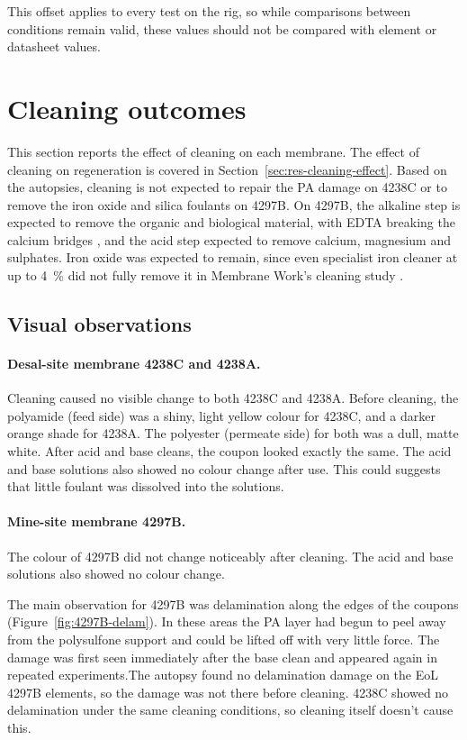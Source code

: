 This offset applies to every test on the rig, so while comparisons between conditions remain valid, these values should not be compared with element or datasheet values.

\section{Cleaning outcomes}
\label{sec:res-cleaning}
This section reports the effect of cleaning on each membrane. The effect of cleaning on regeneration is covered in Section~\ref{sec:res-cleaning-effect}. Based on the autopsies, cleaning is not expected to repair the PA damage on 4238C or to remove the iron oxide and silica foulants on 4297B. On 4297B, the alkaline step is expected to remove the organic and biological material, with EDTA breaking the calcium bridges \citep{Ang2006}, and the acid step expected to remove calcium, magnesium and sulphates. Iron oxide was expected to remain, since even specialist iron cleaner at up to \qty{4}{\percent} did not fully remove it in Membrane Work's cleaning study \citep{MembraneWorks2026Mine}.


\subsection{Visual observations}
\paragraph{Desal-site membrane 4238C and 4238A. } 
Cleaning caused no visible change to both 4238C and 4238A. Before cleaning, the polyamide (feed side) was a shiny, light yellow colour for 4238C, and a darker orange shade for 4238A. The polyester (permeate side) for both was a dull, matte white. After acid and base cleans, the coupon looked exactly the same. The acid and base solutions also showed no colour change after use. This could suggests that little foulant was dissolved into the solutions.

\paragraph{Mine-site membrane 4297B.}
The colour of 4297B did not change noticeably after cleaning. The acid and base solutions also showed no colour change. 

The main observation for 4297B was delamination along the edges of the coupons (Figure~\ref{fig:4297B-delam}). In these areas the PA layer had begun to peel away from the polysulfone support and could be lifted off with very little force. The damage was first seen immediately after the base clean and appeared again in repeated experiments.The autopsy found no delamination damage on the EoL 4297B elements, so the damage was not there before cleaning. 4238C showed no delamination under the same cleaning conditions, so cleaning itself doesn't cause this. 

